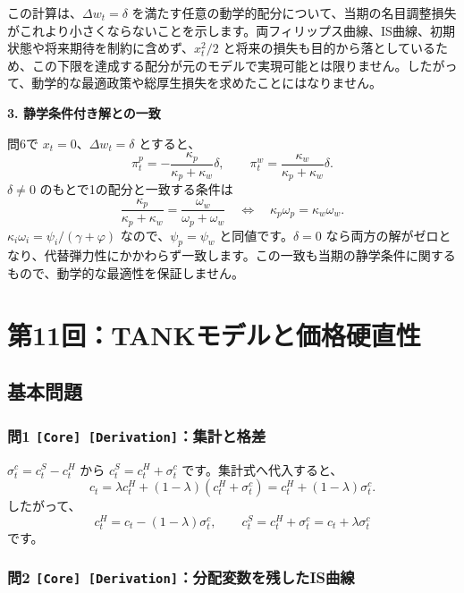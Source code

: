 \documentclass[
  japanese,
  lualatex,
  ja=standard,
  11pt,
  a4paper]{ltjsarticle}
\begin{document}
この計算は、\(\Delta w_t=\delta\)
を満たす任意の動学的配分について、当期の名目調整損失がこれより小さくならないことを示します。両フィリップス曲線、IS曲線、初期状態や将来期待を制約に含めず、\(x_t^2/2\)
と将来の損失も目的から落としているため、この下限を達成する配分が元のモデルで実現可能とは限りません。したがって、動学的な最適政策や総厚生損失を求めたことにはなりません。


\textbf{3. 静学条件付き解との一致}

問6で \(x_t=0\)、\(\Delta w_t=\delta\) とすると、 \[
\pi_t^p=-\frac{\kappa_p}{\kappa_p+\kappa_w}\delta,
\qquad
\pi_t^w=\frac{\kappa_w}{\kappa_p+\kappa_w}\delta.
\] \(\delta\ne0\) のもとで1の配分と一致する条件は \[
\frac{\kappa_p}{\kappa_p+\kappa_w}
=\frac{\omega_w}{\omega_p+\omega_w}
\quad\Longleftrightarrow\quad
\kappa_p\omega_p=\kappa_w\omega_w.
\] \(\kappa_i\omega_i=\psi_i/(\gamma+\varphi)\)
なので、\(\psi_p=\psi_w\) と同値です。\(\delta=0\)
なら両方の解がゼロとなり、代替弾力性にかかわらず一致します。この一致も当期の静学条件に関するもので、動学的な最適性を保証しません。

\clearpage

\section{第11回：TANKモデルと価格硬直性}\label{ux7b2c11ux56detankux30e2ux30c7ux30ebux3068ux4fa1ux683cux786cux76f4ux6027}

\subsection{基本問題}\label{ux57faux672cux554fux984c-10}

\subsubsection{\texorpdfstring{問1
\texttt{{[}Core{]}\ {[}Derivation{]}}：集計と格差}{問1 {[}Core{]} {[}Derivation{]}：集計と格差}}\label{ux554f1-core-derivationux96c6ux8a08ux3068ux683cux5dee}

\(\sigma_t^c=c_t^S-c_t^H\) から \(c_t^S=c_t^H+\sigma_t^c\)
です。集計式へ代入すると、 \[
c_t=\lambda c_t^H+(1-\lambda)(c_t^H+\sigma_t^c)
=c_t^H+(1-\lambda)\sigma_t^c.
\] したがって、 \[
c_t^H=c_t-(1-\lambda)\sigma_t^c,
\qquad
c_t^S=c_t^H+\sigma_t^c=c_t+\lambda\sigma_t^c
\] です。

\subsubsection{\texorpdfstring{問2
\texttt{{[}Core{]}\ {[}Derivation{]}}：分配変数を残したIS曲線}{問2 {[}Core{]} {[}Derivation{]}：分配変数を残したIS曲線}}\label{ux554f2-core-derivationux5206ux914dux5909ux6570ux3092ux6b8bux3057ux305fisux66f2ux7dda}
\end{document}
